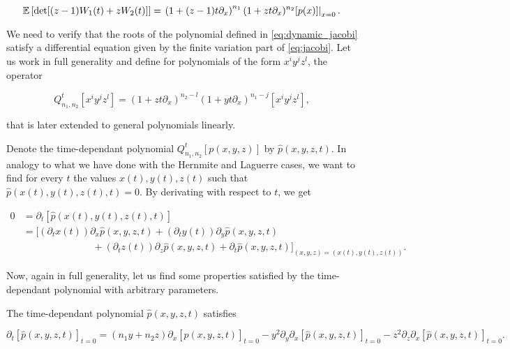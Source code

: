     \begin{equation} \label{eq:dynamic_jacobi}
        \mathbb E \left[ \det[(z-1)W_1(t) + zW_2(t)] \right] = \left.\left(1 + (z-1)t\partial_x\right)^{n_1}(1+zt\partial_x)^{n_2} [p(x)]\right|_{x=0}.
    \end{equation}

    We need to verify that the roots of the polynomial defined in \eqref{eq:dynamic_jacobi} satisfy a differential equation given by the finite variation part of \eqref{eq:jacobi}. Let us work in full generality and define for polynomials of the form $x^i y^j z^l$, the operator

    \begin{equation*}
        Q_{n_1,n_2}^t [x^i y^j z^l] = (1+zt\partial_x)^{n_2-l} \left(1 + yt\partial_x\right)^{n_1 - j}[x^i y^j z^l],
    \end{equation*}

    \noindent that is later extended to general polynomials linearly. 

    Denote the time-dependant polynomial $Q_{n_1,n_2}^t[p(x,y,z)]$ by $\hat p(x,y,z,t)$. In analogy to what we have done with the Hernmite and Laguerre cases, we want to find for every $t$ the values $x(t), y(t), z(t)$ such that $\hat p(x(t),y(t),z(t),t)=0$. By derivating with respect to $t$, we get

    \begin{align*}
       0 &= \partial_t [\hat p(x(t),y(t),z(t),t)]\\ &= [(\partial_t x(t))\partial_x \hat p(x,y,z,t) + (\partial_t y(t))\partial_y  \hat p(x,y,z,t) \\
       &\phantom{espaciooooooooo}+ (\partial_t z(t))\partial_z \hat p(x,y,z,t) + \partial_t \hat p(x,y,z,t)]_{(x,y,z)=(x(t),y(t),z(t))}.
    \end{align*}

    Now, again in full generality, let us find some properties satisfied by the time-dependant polynomial with arbitrary parameters.

    \begin{lemma}
        The time-dependant polynomial $\hat p(x,y,z,t)$ satisfies

        \begin{equation} \label{eq:general_harmonic_roots}
            \partial_t[\hat p(x,y,z,t)]_{t=0} = (n_1y + n_2z)\partial_x[\hat p(x,y,z,t)]_{t=0} - y^2\partial_y\partial_x[\hat p(x,y,z,t)]_{t=0} - z^2\partial_z\partial_x[\hat p(x,y,z,t)]_{t=0}.
        \end{equation}
    \end{lemma}

